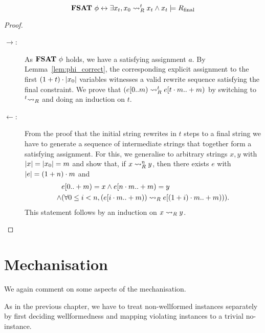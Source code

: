 \begin{theorem}
  \[\textbf{FSAT}~\phi \leftrightarrow \exists x_t, x_0 \rightsquigarrow_{R}^t x_t \land x_t \models R_{\text{final}} \]
\end{theorem}
\begin{proof}\leavevmode
  \begin{description}
    \item[$\rightarrow$:]
      As $\textbf{FSAT}{}~\phi$ holds, we have a satisfying assignment $a$. 
      By Lemma~\ref{lem:phi_correct}, the corresponding explicit assignment to the first $(1 +{t}) \cdot |x_0|$ variables witnesses a valid rewrite sequence satisfying the final constraint. 
      We prove that $(e[0 ..m) \rightsquigarrow_{R}^t e[t \cdot m ..+ m)$ by switching to $\prescript{t}{}{\rightsquigarrow_{R}}$ and doing an induction on $t$.
    \item[$\leftarrow$:]
      From the proof that the initial string rewrites in $t$ steps to a final string we have to generate a sequence of intermediate strings that together form a satisfying assignment. 
      For this, we generalise to arbitrary strings $x, y$ with $|x| = |x_0| = m$ and show that, if $x \rightsquigarrow_{R}^n y$, then there exists $e$ with $|e| = (1 +{n}) \cdot m$ and 
      \begin{align*}
        &e[0..+ m) = x \land e[n \cdot m ..+ m) = y \\
        \land & (\forall 0 \le i < n, (e[i \cdot m ..+ m)) \rightsquigarrow_{R} e[(1 +{i}) \cdot m ..+ m))).
      \end{align*}
      This statement follows by an induction on $x \rightsquigarrow_{R} y$.
  \end{description}
\end{proof}

\section{Mechanisation}
We again comment on some aspects of the mechanisation.

As in the previous chapter, we have to treat non-wellformed instances separately by first deciding wellformedness and mapping violating instances to a trivial no-instance. 

